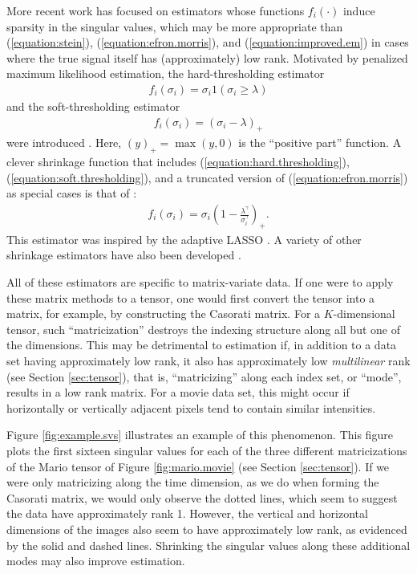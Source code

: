 More recent work has focused on estimators whose functions $f_i(\cdot)$ induce sparsity in the singular values, which may be more appropriate than (\ref{equation:stein}), (\ref{equation:efron.morris}), and (\ref{equation:improved.em})  in cases where the true signal itself has (approximately) low rank. Motivated by penalized maximum likelihood estimation, the hard-thresholding estimator
\begin{align}
\label{equation:hard.thresholding}
f_i(\sigma_i) = \sigma_i 1(\sigma_i \geq \lambda)
\end{align}
and the soft-thresholding estimator
\begin{align}
\label{equation:soft.thresholding}
f_i(\sigma_i) = (\sigma_i - \lambda)_+
\end{align}
 were introduced \citep[for example]{candes2013unbiased}. Here, $(y)_+ = \max(y,0)$ is the ``positive part'' function. A clever shrinkage function that includes (\ref{equation:hard.thresholding}), (\ref{equation:soft.thresholding}), and a truncated version of (\ref{equation:efron.morris}) \citep{verbanck2015regularised} as special cases is that of \cite{josse2015adaptive}:
\begin{align}
\label{equation:josse.sardy.est}
f_i(\sigma_i) = \sigma_i\left(1 - \frac{\lambda^{\gamma}}{\sigma_i^{\gamma}}\right)_+.
\end{align}
This estimator was inspired by the adaptive LASSO \citep{zou2006adaptive}. A variety of other shrinkage estimators have also been developed \citep{nadakuditi2014optshrink,shabalin2013reconstruction}.

All of these estimators are specific to matrix-variate data. If one were to apply these matrix methods to a tensor, one would first convert the tensor into a matrix, for example, by constructing the Casorati matrix. For a $K$-dimensional tensor, such ``matricization'' destroys the indexing structure along all but one of the dimensions. This may be detrimental to estimation if, in addition to a data set having approximately low rank, it also has approximately low \emph{multilinear} rank (see Section \ref{sec:tensor}), that is, ``matricizing'' along each index set, or ``mode'', results in a low rank matrix. For a movie data set, this might occur if horizontally or vertically adjacent pixels tend to contain similar intensities.

Figure \ref{fig:example.svs} illustrates an example of this phenomenon. This figure plots the first sixteen singular values for each of the three different matricizations of the Mario tensor of Figure \ref{fig:mario.movie} (see Section \ref{sec:tensor}). If we were only matricizing along the time dimension, as we do when forming the Casorati matrix, we would only observe the dotted lines, which seem to suggest the data have approximately rank 1. However, the vertical and horizontal dimensions of the images also seem to have approximately low rank, as evidenced by the solid and dashed lines. Shrinking the singular values along these additional modes may also improve estimation.

